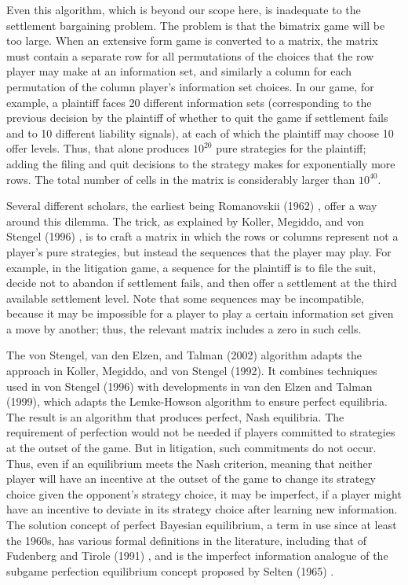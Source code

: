 \documentclass{article}
\begin{document}
Even this algorithm, which is beyond our scope here, is inadequate to the settlement bargaining problem. The problem is that the bimatrix game will be too large. When an extensive form game is converted to a matrix, the matrix must contain a separate row for all permutations of the choices that the row player may make at an information set, and similarly a column for each permutation of the column player's information set choices. In our game, for example, a plaintiff faces 20 different information sets (corresponding to the previous decision by the plaintiff of whether to quit the game if settlement fails and to 10 different liability signals), at each of which the plaintiff may choose 10 offer levels. Thus, that alone produces $10^{20}$ pure strategies for the plaintiff; adding the filing and quit decisions to the strategy makes for exponentially more rows. The total number of cells in the matrix is considerably larger than $10^{40}$. 

Several different scholars, the earliest being Romanovskii (1962) \cite{romanovskii}, offer a way around this dilemma. The trick, as explained by Koller, Megiddo, and von Stengel (1996) \cite{kollermegiddovonstengel}, is to craft a matrix in which the rows or columns represent not a player's pure strategies, but instead the sequences that the player may play. For example, in the litigation game, a sequence for the plaintiff is to file the suit, decide not to abandon if settlement fails, and then offer a settlement at the third available settlement level. Note that some sequences may be incompatible, because it may be impossible for a player to play a certain information set given a move by another; thus, the relevant matrix includes a zero in such cells. 

The von Stengel, van den Elzen, and Talman (2002) algorithm adapts the approach in Koller, Megiddo, and von Stengel (1992). It combines techniques used in von Stengel (1996) with developments in van den Elzen and Talman (1999), which adapts the Lemke-Howson algorithm to ensure perfect equilibria. The result is an algorithm that produces perfect, Nash equilibria. The requirement of perfection would not be needed if players committed to strategies at the outset of the game. But in litigation, such commitments do not occur. Thus, even if an equilibrium meets the Nash criterion, meaning that neither player will have an incentive at the outset of the game to change its strategy choice given the opponent's strategy choice, it may be imperfect, if a player might have an incentive to deviate in its strategy choice after learning new information. The solution concept of perfect Bayesian equilibrium, a term in use since at least the 1960s, has various formal definitions in the literature, including that of Fudenberg and Tirole (1991) \cite{fudenberg}, and is the imperfect information analogue of the subgame perfection equilibrium concept proposed by Selten (1965) \cite{selten}.
\end{document}
